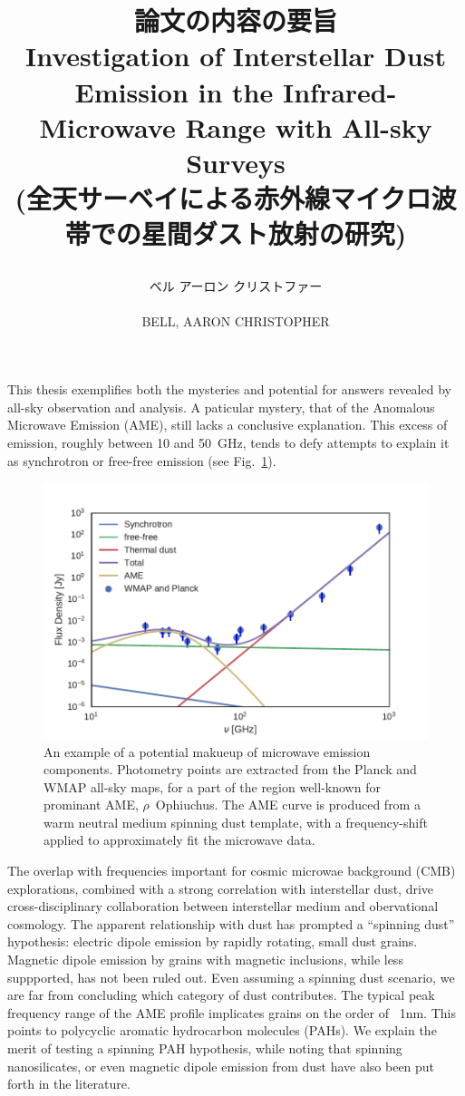 \documentclass[12pt,a4paper]{article}
\title{
\begin{CJK}{UTF8}{min}{\small 論文の内容の要旨}\\
Investigation of Interstellar Dust Emission in the Infrared-Microwave Range with All-sky Surveys\\
{\small(全天サーベイによる赤外線マイクロ波帯での星間ダスト放射の研究)}\\
\end{CJK}
}
\author{
    \begin{CJK}{UTF8}{min}ベル アーロン クリストファー\end{CJK}\\
BELL, AARON CHRISTOPHER}
\date{}
\begin{document}
\maketitle

This thesis exemplifies both the mysteries and potential for answers revealed by all-sky observation and analysis. A paticular mystery, that of the Anomalous Microwave Emission (AME), still lacks a conclusive explanation.  This excess of emission, roughly between 10 and 50~GHz, tends to defy attempts to explain it as synchrotron or free-free emission (see Fig.~\ref{fig:mw_foregrounds_demo_rOph}).
      \begin{figure}[h]
        \centering
        \includegraphics[width=\textwidth/2]{../Plots/ch_intro/mw_foregrounds_demo_rOph_sub_Jy5.pdf}
          \caption{\small An example of a potential makueup of microwave emission components. Photometry points are extracted from the Planck and WMAP all-sky maps, for a part of the region well-known for prominant AME, $\rho$~Ophiuchus. The AME curve is produced from a warm neutral medium spinning dust template, with a frequency-shift applied to approximately fit the microwave data.}
        \label{fig:mw_foregrounds_demo_rOph}
      \end{figure}
The overlap with frequencies important for cosmic microwae background (CMB) explorations, combined with a strong correlation with interstellar dust, drive cross-disciplinary collaboration between interstellar medium and obervational cosmology. The apparent relationship with dust has prompted a ``spinning dust'' hypothesis:  electric dipole emission by rapidly rotating, small dust grains. Magnetic dipole emission by grains with magnetic inclusions, while less suppported, has not been ruled out. Even assuming a spinning dust scenario, we are far from concluding which category of dust contributes. The typical peak frequency range of the AME profile implicates grains on the order of ~1nm. This points to polycyclic aromatic hydrocarbon molecules (PAHs). We explain the merit of testing a spinning PAH hypothesis, while noting that spinning nanosilicates, or even magnetic dipole emission from dust have also been put forth in the literature.
\end{document}
